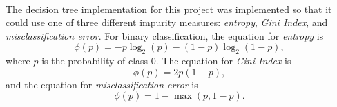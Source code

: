 \documentclass[12pt]{article}
\begin{document}
    \paragraph{}
    The decision tree implementation for this project was implemented so that it could use one of three different impurity measures: \textit{entropy}, \textit{Gini Index}, and \textit{misclassification error}. For binary classification, the equation for \textit{entropy} is
    \begin{equation}
        \label{Eq.3}
    	\phi(p) = -p\log_{2}(p) - (1-p)\log_{2}(1-p),
    \end{equation}
    where $p$ is the probability of class 0. The equation for \textit{Gini Index} is
    \begin{equation}
    	\label{Eq.4}
    	\phi(p) = 2p(1-p),
    \end{equation}
    and the equation for \textit{misclassification error} is
    \begin{equation}
    	\label{Eq.5}
    	\phi(p) = 1 - \max(p, 1-p).
    \end{equation}
\end{document}
